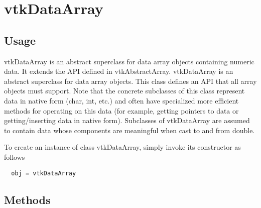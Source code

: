 \section{vtkDataArray}

\subsection{Usage}


 vtkDataArray is an abstract superclass for data array objects
 containing numeric data.  It extends the API defined in
 vtkAbstractArray.  vtkDataArray is an abstract superclass for data
 array objects. This class defines an API that all array objects
 must support. Note that the concrete subclasses of this class
 represent data in native form (char, int, etc.) and often have
 specialized more efficient methods for operating on this data (for
 example, getting pointers to data or getting/inserting data in
 native form).  Subclasses of vtkDataArray are assumed to contain
 data whose components are meaningful when cast to and from double.


To create an instance of class vtkDataArray, simply
invoke its constructor as follows
\begin{verbatim}
  obj = vtkDataArray
\end{verbatim}
\subsection{Methods}

